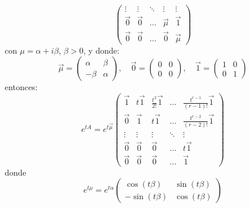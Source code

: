 \begin{enumerate}
$$\begin{pmatrix}
                  \vdots    & \vdots    & \ddots & \vdots    & \vdots    \\
                  \vec{0}   & \vec{0}   & \dots  & \vec{\mu} & \vec{1}   \\
                  \vec{0}   & \vec{0}   & \dots  & \vec{0}   & \vec{\mu}
              \end{pmatrix}$$
          con $\mu = \alpha + i\beta$, $\beta > 0$, y donde:
          $$\vec{\mu} = \begin{pmatrix}
                  \alpha & \beta  \\
                  -\beta & \alpha
              \end{pmatrix}, \quad
              \vec{0} = \begin{pmatrix}
                  0 & 0 \\
                  0 & 0
              \end{pmatrix}, \quad
              \vec{1} = \begin{pmatrix}
                  1 & 0 \\
                  0 & 1
              \end{pmatrix}$$
          entonces:
          $$e^{tA} = e^{t\vec{\mu}} \begin{pmatrix}
                  \vec{1} & t\vec{1} & \frac{t^2}{2!}\vec{1} & \dots  & \frac{t^{r-1}}{(r-1)!}\vec{1} \\
                  \vec{0} & \vec{1}  & t\vec{1}              & \dots  & \frac{t^{r-2}}{(r-2)!}\vec{1} \\
                  \vdots  & \vdots   & \vdots                & \ddots & \vdots                        \\
                  \vec{0} & \vec{0}  & \vec{0}               & \dots  & t\vec{1}                      \\
                  \vec{0} & \vec{0}  & \vec{0}               & \dots  & \vec{1}
              \end{pmatrix}$$
          donde
          $$e^{t\mu} = e^{t\alpha}\begin{pmatrix}
                  \cos(t\beta)  & \sin(t\beta) \\
                  -\sin(t\beta) & \cos(t\beta)
              \end{pmatrix}$$
\end{enumerate}

